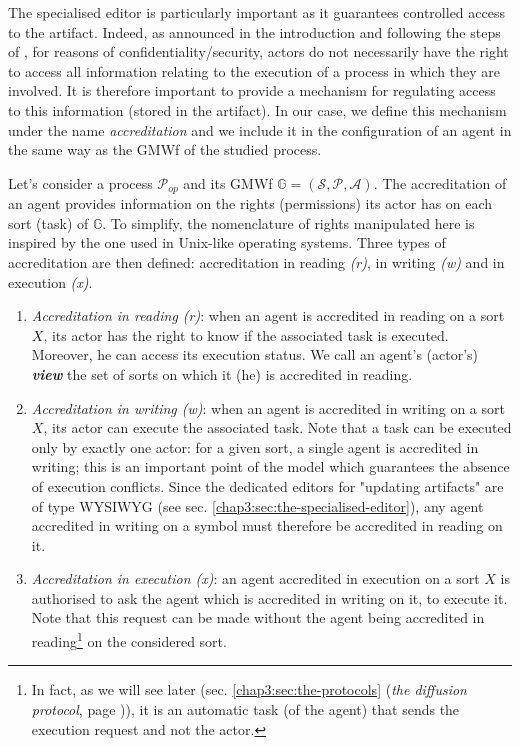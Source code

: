 The specialised editor is particularly important as it guarantees controlled access to the artifact. Indeed, as announced in the introduction and following the steps of \cite{hull2009facilitating}, for reasons of confidentiality/security, actors do not necessarily have the right to access all information relating to the execution of a process in which they are involved. It is therefore important to provide a mechanism for regulating access to this information (stored in the artifact). In our case, we define this mechanism under the name \textit{accreditation} and we include it in the configuration of an agent in the same way as the GMWf of the studied process.


\label{chap3:sec:accreditation-partial-replica}

\label{chap3:sec:accreditation}

Let's consider a process $\mathcal{P}_{op}$ and its GMWf $\mathbb{G}=\left(\mathcal{S},\mathcal{P},\mathcal{A}\right)$. The accreditation of an agent provides information on the rights (permissions) its actor has on each sort (task) of $\mathbb{G}$. 
To simplify, the nomenclature of rights manipulated here is inspired by the one used in Unix-like operating systems. Three types of accreditation are then defined: accreditation in reading \textit{(r)}, in writing \textit{(w)} and in execution \textit{(x)}. 
\begin{enumerate}
	\item \textit{Accreditation in reading \textit{(r)}}: when an agent is accredited in reading on a sort $X$, its actor has the right to know if the associated task is executed. Moreover, he can access its execution status.
	We call an agent's (actor's) \textbf{\textit{view}} the set of sorts on which it (he) is accredited in reading.
	\item \textit{Accreditation in writing \textit{(w)}}: when an agent is accredited in writing on a sort $X$, its actor can execute the associated task. 
	Note that a task can be executed only by exactly one actor: for a given sort, a single agent is accredited in writing; this is an important point of the model which guarantees the absence of execution conflicts. 
	Since the dedicated editors for "updating artifacts" are of type WYSIWYG (see sec. \ref{chap3:sec:the-specialised-editor}), any agent accredited in writing on a symbol must therefore be accredited in reading on it. 
	\item \textit{Accreditation in execution \textit{(x)}}: an agent accredited in execution on a sort $X$ is authorised to ask the agent which is accredited in writing on it, to execute it. Note that this request can be made without the agent being accredited in reading\footnote{In fact, as we will see later (sec. \ref{chap3:sec:the-protocols} (\textit{the diffusion protocol}, page \pageref{chap3:sec:execution-protocol-diffusion})), it is an automatic task (of the agent) that sends the execution request and not the actor.} on the considered sort.
\end{enumerate}

